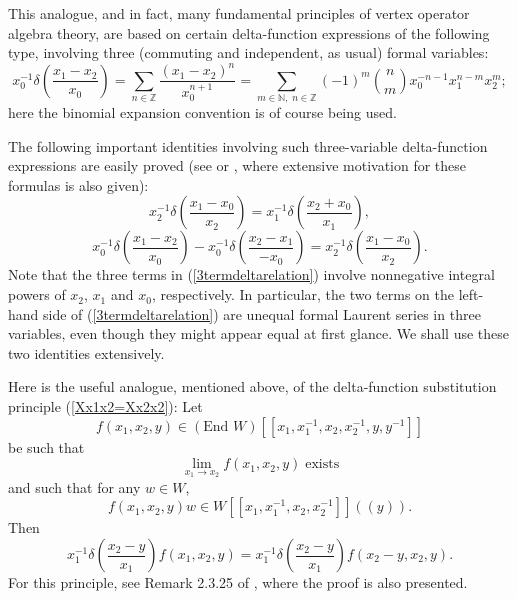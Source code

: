 \documentclass[12pt]{article}
\begin{document}
This analogue, and in fact, many fundamental principles of vertex
operator algebra theory, are based on certain delta-function
expressions of the following type, involving three (commuting and
independent, as usual) formal variables:
\[
x_{0}^{-1}\delta\left(\frac{x_{1}-x_{2}}{x_{0}}\right)=\sum_{n\in
{\mathbb Z}}
\frac{(x_{1}-x_{2})^{n}}{x_{0}^{n+1}}=\sum_{m\in {\mathbb N},\; n\in
{\mathbb Z}}
(-1)^{m}{{n}\choose {m}} x_{0}^{-n-1}x_{1}^{n-m}x_{2}^{m};
\]
here the binomial expansion convention is of course being used.

The following important identities involving such three-variable
delta-function expressions are easily proved (see \cite{FLM2} or
\cite{LL}, where extensive motivation for these formulas is also
given):
\begin{equation}\label{2termdeltarelation}
x_{2}^{-1}\delta\left(\frac{x_{1}-x_{0}}{x_{2}}\right)=
x_{1}^{-1}\delta\left(\frac{x_{2}+x_{0}}{x_{1}}\right),
\end{equation}
\begin{equation}\label{3termdeltarelation}
x_{0}^{-1}\delta\left(\frac{x_{1}-x_{2}}{x_{0}}\right)-
x_{0}^{-1}\delta\left(\frac{x_{2}-x_{1}}{-x_{0}}\right)=
x_{2}^{-1}\delta\left(\frac{x_{1}-x_{0}}{x_{2}}\right).
\end{equation}
Note that the three terms in (\ref{3termdeltarelation}) involve
nonnegative integral powers of $x_2$, $x_1$ and $x_0$, respectively.
In particular, the two terms on the left-hand side of
(\ref{3termdeltarelation}) are unequal formal Laurent series in three
variables, even though they might appear equal at first glance.  We
shall use these two identities extensively.

\begin{rema}\label{deltafunctionsubstitutionremark}{\rm
Here is the useful analogue, mentioned above, of the delta-function
substitution principle (\ref{Xx1x2=Xx2x2}):  Let
\begin{equation}
f(x_1,x_2,y) \in (\mbox{End }W)[[x_{1}, x_{1}^{-1}, x_{2},
x_{2}^{-1},y,y^{-1}]]
\end{equation}
be such that
\begin{equation}
\lim_{x_{1}\to x_{2}}f(x_1,x_2,y) \; \mbox{exists}
\end{equation}
and such that for any $w \in W$,
\begin{equation}
f(x_1,x_2,y)w \in W[[x_1,x_{1}^{-1},x_2,x_{2}^{-1}]]((y)).
\end{equation}
Then
\begin{equation}\label{deltafunctionsubstitutionformula}
x_{1}^{-1}\delta\left(\frac{x_{2}-y}{x_{1}}\right)f(x_1,x_2,y)=
x_{1}^{-1}\delta\left(\frac{x_{2}-y}{x_{1}}\right)f(x_2-y,x_2,y).
\end{equation}
For this principle, see Remark 2.3.25 of \cite{LL}, where the proof is
also presented.}
\end{rema}
\end{document}
